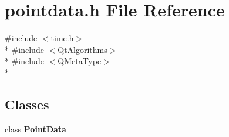 \section{pointdata.\+h File Reference}
\label{bk3_2curve_2pointdata_8h}
{\ttfamily \#include $<$time.\+h$>$}\\*
{\ttfamily \#include $<$Qt\+Algorithms$>$}\\*
{\ttfamily \#include $<$Q\+Meta\+Type$>$}\\*
\subsection*{Classes}
\begin{DoxyCompactItemize}
\item 
class {\bf Point\+Data}
\end{DoxyCompactItemize}
